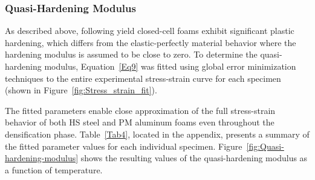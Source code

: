 \documentclass[review]{elsarticle}
\begin{document}
\subsubsection{Quasi-Hardening Modulus}

As described above, following yield closed-cell foams exhibit significant plastic hardening, which differs from the elastic-perfectly material behavior where the hardening modulus is assumed to be close to zero. To determine the quasi-hardening modulus, Equation~\ref{Eq9} was fitted using global error minimization techniques to the entire experimental stress-strain curve for each specimen (shown in Figure~\ref{fig:Stress_strain_fit}).

The fitted parameters enable close approximation of the full stress-strain behavior of both HS steel and PM aluminum foams even throughout the densification phase. Table~\ref{Tab4}, located in the appendix, presents a summary of the fitted parameter values for each individual specimen. Figure~\ref{fig:Quasi-hardening-modulus} shows the resulting values of the quasi-hardening modulus as a function of temperature.
\end{document}
